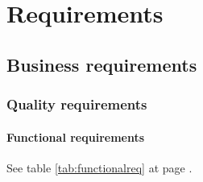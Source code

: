\chapter{Requirements}

\section{Business requirements}

\subsection{Quality requirements}

\subsubsection{Functional requirements}
See table \ref{tab:functionalreq} at page \pageref{tab:functionalreq}.

